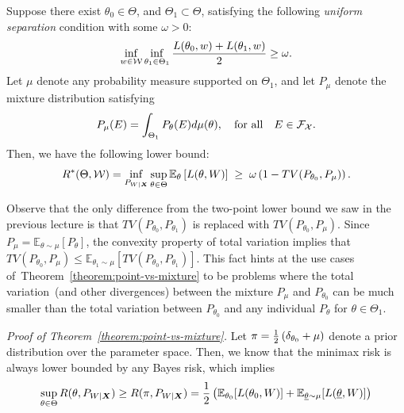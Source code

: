 \documentclass[12pt]{article}
\begin{document}
\begin{theorem}
	\label{theorem:point-vs-mixture} Suppose there exist $\theta_0 \in \Theta$, and $\Theta_1 \subset \Theta$, satisfying the following \emph{uniform separation} condition with some $\omega>0$: 
	\begin{align}
	\inf_{w \in {\cal W}} \inf_{\theta_1 \in \Theta_1} \frac{L(\theta_0, w) + L(\theta_1, w)}{2} \geq \omega. 
	\end{align}
	Let $\mu$ denote any probability measure supported on $\Theta_1$, and let $P_\mu$ denote the mixture distribution satisfying 
	\begin{align}
	P_\mu(E) = \int_{\Theta_1} P_\theta(E) d\mu(\theta), \quad \text{for all} \quad E \in {\cal F}_{{\cal X}}. 
	\end{align}
	Then, we have the following lower bound: 
	\begin{align}
		R^*(\Theta, {\cal W}) = \inf_{P_{W|{\boldsymbol X}}} \sup_{\theta \in \Theta} \mathbb{E}_{\theta}\left[ L(\theta, W) \right] \; \geq \;  \omega \left( 1 - TV(P_{\theta_0}, P_\mu) \right).  \label{eq:point-vs-mixture-1}
	\end{align}
\end{theorem}
\begin{remark}
\label{remark:mixture-justification-1}
	Observe that the only difference from the two-point lower bound we saw in the previous lecture is that $TV(P_{\theta_0}, P_{\theta_1})$ is replaced with $TV(P_{\theta_0}, P_{\mu})$. Since $P_\mu = \mathbb{E}_{\theta \sim \mu}[P_\theta]$, the convexity property of total variation implies that $TV(P_{\theta_0}, P_\mu) \leq \mathbb{E}_{\theta_1 \sim \mu}[TV(P_{\theta_0}, P_{\theta_1} )]$. This fact hints at the use cases of~Theorem~\ref{theorem:point-vs-mixture} to be problems where the total variation~(and other divergences) between the mixture $P_{\mu}$ and $P_{\theta_0}$ can be much smaller than the total variation between $P_{\theta_0}$ and any individual $P_{\theta}$ for $\theta \in \Theta_1$. 
\end{remark}
\emph{Proof of Theorem~\ref{theorem:point-vs-mixture}.} Let $\pi = \frac{1}{2} \left( \delta_{\theta_0} + \mu \right)$ denote a prior distribution over the parameter space. Then, we know that the minimax risk is always lower bounded by any Bayes risk, which implies 
\begin{align}
	\sup_{\theta \in \Theta} R(\theta, P_{W|{\boldsymbol X}}) \geq R(\pi, P_{W|{\boldsymbol X}}) = \frac{1}{2}\left( \mathbb{E}_{\theta_0}[L(\theta_0, W)]  +  \mathbb{E}_{\underline{\theta} \sim\mu}[L(\underline{\theta}, W)]\right)
\end{align}
\end{document}
